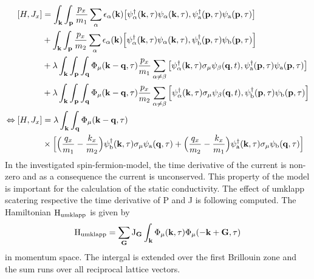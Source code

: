 \begin{align}
	\comm{H}{J_{x}} &=
		\int_{\vb{k}} \int_{\vb{p}}
		\frac{p_{x}}{m_{1}}
		\sum\limits_{\alpha} 
		\epsilon_{\alpha}(\vb{k})
		\comm{
			\psi_{\alpha}^{\dag}(\vb{k},\tau) 
			\psi_{\alpha}(\vb{k},\tau)
		}{	
			\psi_{\mt{a}}^{\dag}(\vb{p},\tau)	
			\psi_{\mt{a}}(\vb{p},\tau)
		}
		\notag \\&
		+
		\int_{\vb{k}} \int_{\vb{p}}
		\frac{p_{x}}{m_{2}}
		\sum\limits_{\alpha} 
		\epsilon_{\alpha}(\vb{k})
		\comm{
			\psi_{\alpha}^{\dag}(\vb{k},\tau) 
			\psi_{\alpha}(\vb{k},\tau)
		}{	
			\psi_{\mt{b}}^{\dag}(\vb{p},\tau)
			\psi_{\mt{b}}(\vb{p},\tau)
		}
		\notag \\&
		+
		\lambda
		\int_{\vb{k}} \int_{\vb{p}} \int_{\vb{q}}
		\Phi_{\mu}(\vb{k}-\vb{q},\tau)
		\frac{p_{x}}{m_{1}}
		\sum\limits_{\alpha\neq\beta}
		\comm{
			\psi_{\alpha}^{\dag}(\vb{k},\tau) 
			\sigma_{\mu} 
			\psi_{\beta}(\vb{q},t)
		}{
			\psi_{\mt{a}}^{\dag}(\vb{p},\tau)	
			\psi_{\mt{a}}(\vb{p},\tau)
		}
		\notag \\&
		+
		\lambda
		\int_{\vb{k}} \int_{\vb{p}} \int_{\vb{q}}
		\Phi_{\mu}(\vb{k}-\vb{q},\tau)
		\frac{p_{x}}{m_{2}}
		\sum\limits_{\alpha\neq\beta}
		\comm{
			\psi_{\alpha}^{\dag}(\vb{k},\tau) 
			\sigma_{\mu} 
			\psi_{\beta}(\vb{q},t)
		}{
			\psi_{\mt{b}}^{\dag}(\vb{p},\tau)
			\psi_{\mt{b}}(\vb{p},\tau)
		}
	\notag \\
	\Leftrightarrow \comm{H}{J_{x}} &=
		\lambda
		\int_{\vb{k}} \int_{\vb{q}}
		\Phi_{\mu}(\vb{k}-\vb{q},\tau) 
		\notag \\&
		\times \Big[
			\Big(\frac{q_{x}}{m_{1}} - \frac{k_{x}}{m_{2}}\Big)
			\psi_{\mt{b}}^{\dag}(\vb{k},\tau) \sigma_{\mu} \psi_{\mt{a}}(\vb{q},\tau)
			+
			\Big(\frac{q_{x}}{m_{2}} - \frac{k_{x}}{m_{1}}\Big)
			\psi_{\mt{a}}^{\dag}(\vb{k},\tau) \sigma_{\mu} \psi_{\mt{b}}(\vb{q},\tau)
		\Big]
\end{align}
%
In the investigated spin-fermion-model, the time derivative of the current is non-zero and as a consequence the current is unconserved.
This property of the model is important for the calculation of the static conductivity.
The effect of umklapp scatering respective the time derivative of P and J is following computed.
The Hamiltonian $\mathrm{H}_{\mathrm{umklapp}}$ is given by
%
\begin{align}
	\mathrm{H}_{\mathrm{umklapp}}= \sum\limits_{\vb{G}} \mathrm{J}_{\vb{G}} \int_{\vb{k}} \Phi_{\mu}(\vb{k},\tau) \Phi_{\mu}(-\vb{k}+\vb{G},\tau)
\end{align}
%
in momentum space.
The intergal is extended over the first Brillouin zone and the sum runs over all reciprocal lattice vectors.
